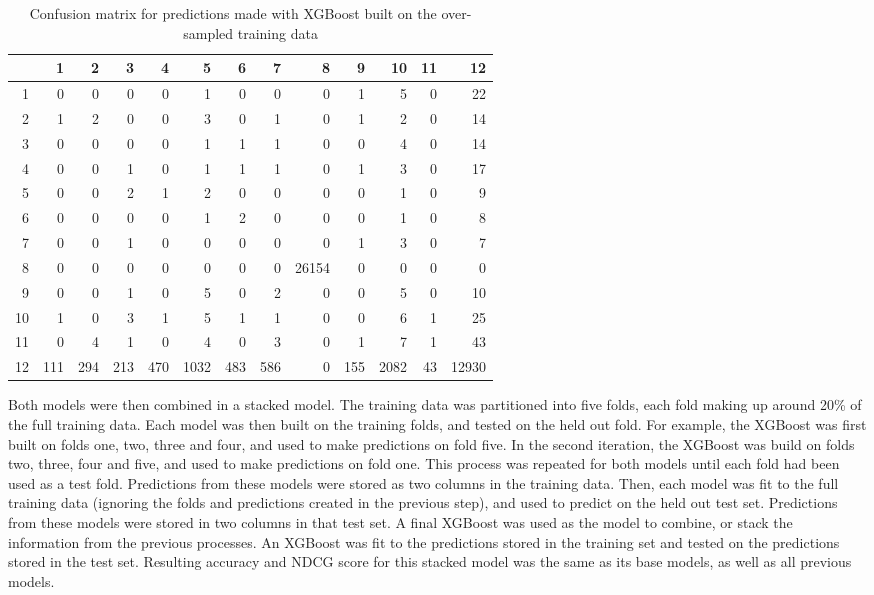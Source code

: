 \documentclass{article}
\begin{document}
\begin{table}[ht]
\centering
\begin{tabular}{r | rrrrrrrrrrrr}
 & 1 & 2 & 3 & 4 & 5 & 6 & 7 & 8 & 9 & 10 & 11 & 12 \\ 
  \hline
1 &   0 &   0 &   0 &   0 &   1 &   0 &   0 &   0 &   1 &   5 &   0 &  22 \\ 
  2 &   1 &   2 &   0 &   0 &   3 &   0 &   1 &   0 &   1 &   2 &   0 &  14 \\ 
  3 &   0 &   0 &   0 &   0 &   1 &   1 &   1 &   0 &   0 &   4 &   0 &  14 \\ 
  4 &   0 &   0 &   1 &   0 &   1 &   1 &   1 &   0 &   1 &   3 &   0 &  17 \\ 
  5 &   0 &   0 &   2 &   1 &   2 &   0 &   0 &   0 &   0 &   1 &   0 &   9 \\ 
  6 &   0 &   0 &   0 &   0 &   1 &   2 &   0 &   0 &   0 &   1 &   0 &   8 \\ 
  7 &   0 &   0 &   1 &   0 &   0 &   0 &   0 &   0 &   1 &   3 &   0 &   7 \\ 
  8 &   0 &   0 &   0 &   0 &   0 &   0 &   0 & 26154 &   0 &   0 &   0 &   0 \\ 
  9 &   0 &   0 &   1 &   0 &   5 &   0 &   2 &   0 &   0 &   5 &   0 &  10 \\ 
  10 &   1 &   0 &   3 &   1 &   5 &   1 &   1 &   0 &   0 &   6 &   1 &  25 \\ 
  11 &   0 &   4 &   1 &   0 &   4 &   0 &   3 &   0 &   1 &   7 &   1 &  43 \\ 
  12 & 111 & 294 & 213 & 470 & 1032 & 483 & 586 &   0 & 155 & 2082 &  43 & 12930 \\ 
\end{tabular}
\caption{Confusion matrix for predictions made with XGBoost built on the over-sampled training data}
\label{cm:over_sampled}
\end{table}


Both models were then combined in a stacked model. The training data was partitioned into five folds, each 
fold making up around 20\% of the full training data. Each model was then built on the training folds, and 
tested on the held out fold. For example, the XGBoost was first built on folds one, two, three and four, and 
used to make predictions on fold five. In the second iteration, the XGBoost was build on folds two, three, 
four and five, and used to make predictions on fold one. This process was repeated for both models until each 
fold had been used as a test fold. Predictions from these models were stored as two columns in the training data. 
Then, each model was fit to the full training data (ignoring the folds and predictions created in the
previous step), and used to predict on the held out test set. Predictions from these models were stored in two 
columns in that test set. A final XGBoost was used as the model to combine, or stack the information from the 
previous processes. An XGBoost was fit to the predictions stored in the training set and tested on the predictions 
stored in the test set. Resulting accuracy and NDCG score for this stacked model was the same as its base models, 
as well as all previous models. 
\end{document}
